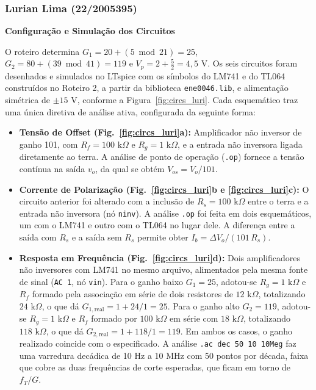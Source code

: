 \documentclass[11pt,a4paper]{article}
\begin{document}
\subsubsection{Lurian Lima (22/2005395)}

\textbf{Configuração e Simulação dos Circuitos}

O roteiro determina $G_1=20+(5\bmod 21)=25$, $G_2=80+(39\bmod 41)=119$ e $V_p=2+\tfrac{5}{2}=4{,}5\text{ V}$. Os seis circuitos foram desenhados e simulados no LTspice com os símbolos do LM741 e do TL064 construídos no Roteiro 2, a partir da biblioteca \texttt{ene0046.lib}, e alimentação simétrica de $\pm15\text{ V}$, conforme a Figura~\ref{fig:circs_luri}. Cada esquemático traz uma única diretiva de análise ativa, configurada da seguinte forma:

\begin{itemize}
    \item \textbf{Tensão de Offset (Fig.~\ref{fig:circs_luri}a):} Amplificador não inversor de ganho 101, com $R_f=100\text{ k}\Omega$ e $R_g=1\text{ k}\Omega$, e a entrada não inversora ligada diretamente ao terra. A análise de ponto de operação (\texttt{.op}) fornece a tensão contínua na saída $v_o$, da qual se obtém $V_{os}=V_o/101$.

    \item \textbf{Corrente de Polarização (Fig.~\ref{fig:circs_luri}b e \ref{fig:circs_luri}c):} O circuito anterior foi alterado com a inclusão de $R_s=100\text{ k}\Omega$ entre o terra e a entrada não inversora (nó \texttt{ninv}). A análise \texttt{.op} foi feita em dois esquemáticos, um com o LM741 e outro com o TL064 no lugar dele. A diferença entre a saída com $R_s$ e a saída sem $R_s$ permite obter $I_b=\Delta V_o/(101\,R_s)$.

    \item \textbf{Resposta em Frequência (Fig.~\ref{fig:circs_luri}d):} Dois amplificadores não inversores com LM741 no mesmo arquivo, alimentados pela mesma fonte de sinal (\texttt{AC 1}, nó \texttt{vin}). Para o ganho baixo $G_1=25$, adotou-se $R_g=1\text{ k}\Omega$ e $R_f$ formado pela associação em série de dois resistores de $12\text{ k}\Omega$, totalizando $24\text{ k}\Omega$, o que dá $G_{1,\text{real}}=1+24/1=25$. Para o ganho alto $G_2=119$, adotou-se $R_g=1\text{ k}\Omega$ e $R_f$ formado por $100\text{ k}\Omega$ em série com $18\text{ k}\Omega$, totalizando $118\text{ k}\Omega$, o que dá $G_{2,\text{real}}=1+118/1=119$. Em ambos os casos, o ganho realizado coincide com o especificado. A análise \texttt{.ac dec 50 10 10Meg} faz uma varredura decádica de 10 Hz a 10 MHz com 50 pontos por década, faixa que cobre as duas frequências de corte esperadas, que ficam em torno de $f_T/G$.


\end{itemize}
\end{document}
